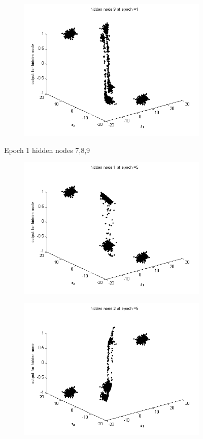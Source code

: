 \documentclass{article}
\begin{document}
\begin{flushleft}
\begin{figure}
\begin{subfigure}{.3\textwidth}
\end{subfigure}
\begin{subfigure}{.3\textwidth}
  \centering
  \includegraphics[width=.8\linewidth]{Classification/linearlySeparable/h1_9}
  
\end{subfigure}
\caption{Epoch 1 hidden nodes 7,8,9}
\end{figure}

\newpage
\begin{figure}
\begin{subfigure}{.3\textwidth}
  \centering
  \includegraphics[width=.8\linewidth]{Classification/linearlySeparable/h5_1}
 
\end{subfigure}%
\begin{subfigure}{.3\textwidth}
  \centering
  \includegraphics[width=.8\linewidth]{Classification/linearlySeparable/h5_2}
  

\end{subfigure}
\end{figure}
\end{flushleft}
\end{document}
